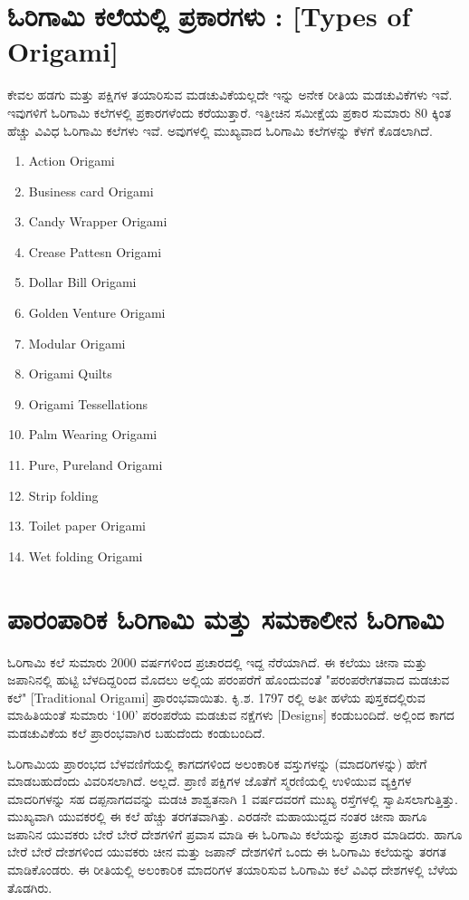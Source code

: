 \section*{ಓರಿಗಾಮಿ ಕಲೆಯಲ್ಲಿ ಪ್ರಕಾರಗಳು : [Types of Origami]}
ಕೇವಲ ಹಡಗು ಮತ್ತು ಪಕ್ಷಿಗಳ ತಯಾರಿಸುವ ಮಡಚುವಿಕೆಯಲ್ಲದೇ ಇನ್ನು ಅನೇಕ ರೀತಿಯ ಮಡಚುವಿಕೆಗಳು ಇವೆ. ಇವುಗಳಿಗೆ ಓರಿಗಾಮಿ ಕಲೆಗಳಲ್ಲಿ ಪ್ರಕಾರಗಳೆಂದು ಕರೆಯುತ್ತಾರೆ. ಇತ್ತೀಚಿನ ಸಮೀಕ್ಷೆಯ ಪ್ರಕಾರ ಸುಮಾರು 80 ಕ್ಕಿಂತ ಹೆಚ್ಚು ವಿವಿಧ ಓರಿಗಾಮಿ ಕಲೆಗಳು ಇವೆ. ಅವುಗಳಲ್ಲಿ ಮುಖ್ಯವಾದ ಓರಿಗಾಮಿ ಕಲೆಗಳನ್ನು ಕೆಳಗೆ ಕೊಡಲಾಗಿದೆ. 
\begin{enumerate}
\item Action Origami
\item Business card Origami
\item Candy Wrapper Origami 
\item Crease Pattesn Origami 
\item Dollar Bill Origami 
\item Golden Venture Origami 
\item Modular Origami 
\item Origami  Quilts
\item Origami  Tessellations
\item Palm Wearing Origami 
\item Pure, Pureland Origami 
\item Strip folding 
\item Toilet paper Origami 
\item Wet folding Origami 
\end{enumerate}

\section{ಪಾರಂಪಾರಿಕ ಓರಿಗಾಮಿ ಮತ್ತು ಸಮಕಾಲೀನ ಓರಿಗಾಮಿ}
ಓರಿಗಾಮಿ ಕಲೆ ಸುಮಾರು 2000 ವರ್ಷಗಳಿಂದ ಪ್ರಚಾರದಲ್ಲಿ ಇದ್ದ ನೆರೆಯಾಗಿದೆ. ಈ ಕಲೆಯು ಚೀನಾ ಮತ್ತು ಜಪಾನಿನಲ್ಲಿ ಹುಟ್ಟಿ ಬೆಳದಿದ್ದರಿಂದ ಮೊದಲು ಅಲ್ಲಿಯ ಪರಂಪರೆಗೆ ಹೊಂದುವಂತೆ "ಪರಂಪರೇಗತವಾದ ಮಡಚುವ ಕಲೆ" [Traditional Origami] ಪ್ರಾರಂಭವಾಯಿತು. ಕಿೃ.ಶ. 1797 ರಲ್ಲಿ ಅತೀ ಹಳೆಯ ಪುಸ್ತಕದಲ್ಲಿರುವ ಮಾಹಿತಿಯಂತೆ ಸುಮಾರು `100' ಪರಂಪರೆಯ ಮಡಚುವ ನಕ್ಷೆಗಳು [Designs] ಕಂಡುಬಂದಿದೆ. ಅಲ್ಲಿಂದ ಕಾಗದ ಮಡಚುವಿಕೆಯ ಕಲೆ ಪ್ರಾರಂಭವಾಗಿರ ಬಹುದೆಂದು ಕಂಡುಬಂದಿದೆ. 


ಓರಿಗಾಮಿಯ ಪ್ರಾರಂಭದ ಬೆಳವಣಿಗೆಯಲ್ಲಿ ಕಾಗದಗಳಿಂದ ಅಲಂಕಾರಿಕ ವಸ್ತುಗಳನ್ನು (ಮಾದರಿಗಳನ್ನು) ಹೇಗೆ ಮಾಡಬಹುದೆಂದು ವಿವರಿಸಲಾಗಿದೆ. ಅಲ್ಲದೆ. ಪ್ರಾಣಿ ಪಕ್ಷಿಗಳ ಜೊತೆಗೆ ಸ್ಮರಣಿಯಲ್ಲಿ ಉಳಿಯುವ ವ್ಯಕ್ತಿಗಳ ಮಾದರಿಗಳನ್ನು ಸಹ ದಪ್ಪನಾಗದವನ್ನು ಮಡಚಿ ಶಾಶ್ವತನಾಗಿ 1 ವರ್ಷದವರಗೆ ಮುಖ್ಯ ರಸ್ತೆಗಳಲ್ಲಿ ಸ್ವಾಪಿಸಲಾಗುತ್ತಿತ್ತು. ಮುಖ್ಯವಾಗಿ ಯುವಕರಲ್ಲಿ ಈ ಕಲೆ ಹೆಚ್ಚು ತರಗತವಾಗಿತ್ತು. ಎರಡನೇ ಮಹಾಯುದ್ದದ ನಂತರ ಚೀನಾ ಹಾಗೂ ಜಪಾನಿನ ಯುವಕರು ಬೇರೆ ಬೇರೆ ದೇಶಗಳಿಗೆ ಪ್ರವಾಸ ಮಾಡಿ ಈ ಓರಿಗಾಮಿ ಕಲೆಯನ್ನು ಪ್ರಚಾರ ಮಾಡಿದರು. ಹಾಗೂ ಬೇರೆ ಬೇರೆ ದೇಶಗಳಿಂದ ಯುವಕರು ಚೀನ  ಮತ್ತು ಜಪಾನ್ ದೇಶಗಳಿಗೆ ಒಂದು ಈ ಓರಿಗಾಮಿ ಕಲೆಯನ್ನು ತರಗತ ಮಾಡಿಕೊಂಡರು. ಈ ರೀತಿಯಲ್ಲಿ ಅಲಂಕಾರಿಕ ಮಾದರಿಗಳ ತಯಾರಿಸುವ ಓರಿಗಾಮಿ ಕಲೆ ವಿವಿಧ ದೇಶಗಳಲ್ಲಿ ಬೆಳೆಯ ತೊಡಗಿರು. 

